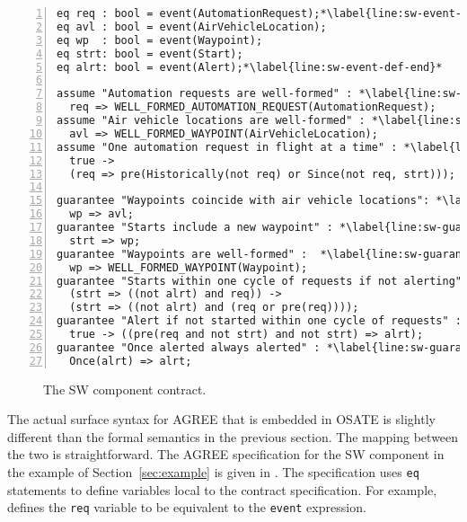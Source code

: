 \newsavebox{\sw}
\begin{lrbox}{\sw}
\begin{lstlisting}[style=agree,numbers=left]
eq req : bool = event(AutomationRequest);*\label{line:sw-event-def-start}*
eq avl : bool = event(AirVehicleLocation);
eq wp  : bool = event(Waypoint);
eq strt: bool = event(Start);
eq alrt: bool = event(Alert);*\label{line:sw-event-def-end}*

assume "Automation requests are well-formed" : *\label{line:sw-assume-1}*
  req => WELL_FORMED_AUTOMATION_REQUEST(AutomationRequest);
assume "Air vehicle locations are well-formed" : *\label{line:sw-assume-2}*
  avl => WELL_FORMED_WAYPOINT(AirVehicleLocation);
assume "One automation request in flight at a time" : *\label{line:sw-assume-3}*
  true ->
  (req => pre(Historically(not req) or Since(not req, strt)));

guarantee "Waypoints coincide with air vehicle locations": *\label{line:sw-guarantee-1}*
  wp => avl;
guarantee "Starts include a new waypoint" : *\label{line:sw-guarantee-2}*
  strt => wp;
guarantee "Waypoints are well-formed" :  *\label{line:sw-guarantee-3}*
  wp => WELL_FORMED_WAYPOINT(Waypoint);
guarantee "Starts within one cycle of requests if not alerting" : *\label{line:sw-guarantee-4}*
  (strt => ((not alrt) and req)) ->
  (strt => ((not alrt) and (req or pre(req))));
guarantee "Alert if not started within one cycle of requests" : *\label{line:sw-guarantee-5}*
  true -> ((pre(req and not strt) and not strt) => alrt);
guarantee "Once alerted always alerted" : *\label{line:sw-guarantee-6}*
  Once(alrt) => alrt;
\end{lstlisting}
\end{lrbox}

\begin{figure}
  \begin{center}
    \scalebox{0.62}{\usebox{\sw}}
  \end{center}
  \caption{The SW component contract.}
  \label{fig:sw}
\end{figure}

The actual surface syntax for AGREE that is embedded in OSATE is slightly different than the formal semantics in the previous section.
The mapping between the two is straightforward.
The AGREE specification for the SW component in the example of
Section~\ref{sec:example} is given in .  The
specification uses \texttt{eq} statements to define variables local to
the contract specification.  For
example,  defines the \texttt{req}
variable to be equivalent to the \texttt{event} expression.

